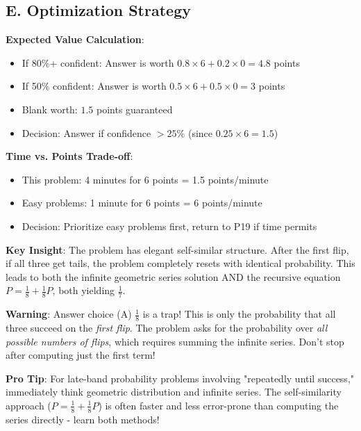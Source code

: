 \documentclass[11pt]{article}
\begin{document}
\begin{competitionbox}
\subsection*{E. Optimization Strategy}

\textbf{Expected Value Calculation}:
\begin{itemize}
    \item If 80\%+ confident: Answer is worth $0.8 \times 6 + 0.2 \times 0 = 4.8$ points
    \item If 50\% confident: Answer is worth $0.5 \times 6 + 0.5 \times 0 = 3$ points
    \item Blank worth: $1.5$ points guaranteed
    \item Decision: Answer if confidence $> 25\%$ (since $0.25 \times 6 = 1.5$)
\end{itemize}

\textbf{Time vs. Points Trade-off}:
\begin{itemize}
    \item This problem: 4 minutes for 6 points = 1.5 points/minute
    \item Easy problems: 1 minute for 6 points = 6 points/minute
    \item Decision: Prioritize easy problems first, return to P19 if time permits
\end{itemize}
\end{competitionbox}

\vspace{1em}

\begin{keyinsightbox}
\textbf{Key Insight}: The problem has elegant self-similar structure. After the first flip, if all three get tails, the problem completely resets with identical probability. This leads to both the infinite geometric series solution AND the recursive equation $P = \frac{1}{8} + \frac{1}{8}P$, both yielding $\boxed{\frac{1}{7}}$.
\end{keyinsightbox}

\begin{warningbox}
\textbf{Warning}: Answer choice (A) $\frac{1}{8}$ is a trap! This is only the probability that all three succeed on the \textit{first flip}. The problem asks for the probability over \textit{all possible numbers of flips}, which requires summing the infinite series. Don't stop after computing just the first term!
\end{warningbox}

\begin{tipbox}
\textbf{Pro Tip}: For late-band probability problems involving "repeatedly until success," immediately think geometric distribution and infinite series. The self-similarity approach ($P = \frac{1}{8} + \frac{1}{8}P$) is often faster and less error-prone than computing the series directly - learn both methods!
\end{tipbox}
\end{document}
